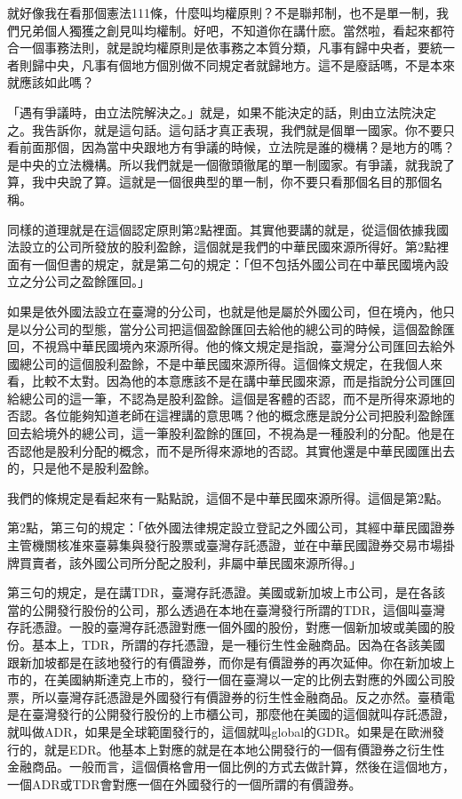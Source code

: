 \documentclass[]{ctexbook}
\begin{document}
就好像我在看那個憲法111條，什麼叫均權原則？不是聯邦制，也不是單一制，我們兄弟個人獨獲之創見叫均權制。好吧，不知道你在講什麽。當然啦，看起來都符合一個事務法則，就是說均權原則是依事務之本質分類，凡事有歸中央者，要統一者則歸中央，凡事有個地方個別做不同規定者就歸地方。這不是廢話嗎，不是本來就應該如此嗎？

「遇有爭議時，由立法院解決之。」就是，如果不能決定的話，則由立法院決定之。我告訴你，就是這句話。這句話才真正表現，我們就是個單一國家。你不要只看前面那個，因為當中央跟地方有爭議的時候，立法院是誰的機構？是地方的嗎？是中央的立法機構。所以我們就是一個徹頭徹尾的單一制國家。有爭議，就我說了算，我中央說了算。這就是一個很典型的單一制，你不要只看那個名目的那個名稱。

同樣的道理就是在這個認定原則第2點裡面。其實他要講的就是，從這個依據我國法設立的公司所發放的股利盈餘，這個就是我們的中華民國來源所得好。第2點裡面有一個但書的規定，就是第二句的規定：「但不包括外國公司在中華民國境內設立之分公司之盈餘匯回。」

如果是依外國法設立在臺灣的分公司，也就是他是屬於外國公司，但在境內，他只是以分公司的型態，當分公司把這個盈餘匯回去給他的總公司的時候，這個盈餘匯回，不視爲中華民國境內來源所得。他的條文規定是指說，臺灣分公司匯回去給外國總公司的這個股利盈餘，不是中華民國來源所得。這個條文規定，在我個人來看，比較不太對。因為他的本意應該不是在講中華民國來源，而是指說分公司匯回給總公司的這一筆，不認為是股利盈餘。這個是客體的否認，而不是所得來源地的否認。各位能夠知道老師在這裡講的意思嗎？他的概念應是說分公司把股利盈餘匯回去給境外的總公司，這一筆股利盈餘的匯回，不視為是一種股利的分配。他是在否認他是股利分配的概念，而不是所得來源地的否認。其實他還是中華民國匯出去的，只是他不是股利盈餘。

我們的條規定是看起來有一點點說，這個不是中華民國來源所得。這個是第2點。

第2點，第三句的規定：「依外國法律規定設立登記之外國公司，其經中華民國證券主管機關核准來臺募集與發行股票或臺灣存託憑證，並在中華民國證券交易市場掛牌買賣者，該外國公司所分配之股利，非屬中華民國來源所得。」

第三句的規定，是在講TDR，臺灣存託憑證。美國或新加坡上市公司，是在各該當的公開發行股份的公司，那么透過在本地在臺灣發行所謂的TDR，這個叫臺灣存託憑證。一股的臺灣存託憑證對應一個外國的股份，對應一個新加坡或美國的股份。基本上，TDR，所謂的存托憑證，是一種衍生性金融商品。因為在各該美國跟新加坡都是在該地發行的有價證券，而你是有價證券的再次延伸。你在新加坡上市的，在美國納斯達克上市的，發行一個在臺灣以一定的比例去對應的外國公司股票，所以臺灣存託憑證是外國發行有價證券的衍生性金融商品。反之亦然。臺積電是在臺灣發行的公開發行股份的上市櫃公司，那麼他在美國的這個就叫存託憑證，就叫做ADR，如果是全球範圍發行的，這個就叫global的GDR。如果是在歐洲發行的，就是EDR。他基本上對應的就是在本地公開發行的一個有價證券之衍生性金融商品。一般而言，這個價格會用一個比例的方式去做計算，然後在這個地方，一個ADR或TDR會對應一個在外國發行的一個所謂的有價證券。
\end{document}
